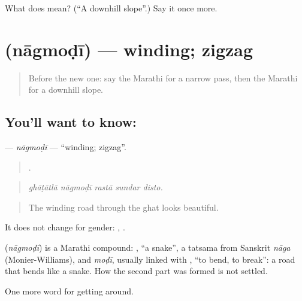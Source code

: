 \begin{tcolorbox}[breakable,colback=teal!4,colframe=teal!35!black,title={Before you move on}]
What does  mean? (\textquotedblleft{}A downhill slope\textquotedblright{}.) Say it once more.
\end{tcolorbox}
\section[\texorpdfstring{\mr{नागमोडी} (nāgmoḍī)}{नागमोडी (nāgmoḍī)}]{ (nāgmoḍī) — winding; zigzag}

\label{lesson:MR-C402-nagmodi}



\begin{quote}
Before the new one: say the Marathi for a narrow pass, then the Marathi for a downhill slope.
\end{quote}

\subsection*{You'll want to know: }
\textbf{} — \emph{nāgmoḍī} — \textquotedblleft{}winding; zigzag\textquotedblright{}.

\begin{quote}
    .
\end{quote}

\begin{quote}
\emph{ghāṭātlā nāgmoḍī rastā sundar disto.}
\end{quote}

\begin{quote}
The winding road through the ghat looks beautiful.
\end{quote}

It does not change for gender:  ,  .

\begin{cousinweb}
\textbf{} (\emph{nāgmoḍī}) is a Marathi compound: \textbf{}, \textquotedblleft{}a snake\textquotedblright{}, a tatsama from Sanskrit \emph{nāga} (Monier-Williams), and \emph{moḍī}, usually linked with \textbf{}, \textquotedblleft{}to bend, to break\textquotedblright{}: a road that bends like a snake. How the second part was formed is not settled.
\end{cousinweb}

\begin{grammarlens}[title={What you've built}]
One more word for getting around.
\end{grammarlens}

